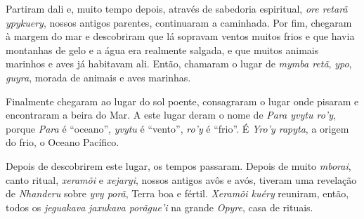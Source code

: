 Partiram dali e, muito tempo depois, através de sabedoria espiritual,
\emph{ore retarã ypykuery}, nossos antigos parentes, continuaram a
caminhada. Por fim, chegaram à margem do mar e descobriram que lá
sopravam ventos muitos frios e que havia montanhas de gelo e a água era
realmente salgada, e que muitos animais marinhos e aves já habitavam
ali. Então, chamaram o lugar de \emph{mymba retã}, \emph{ypo},
\emph{guyra}, morada de animais e aves marinhas.

Finalmente chegaram ao lugar do sol poente, consagraram o lugar onde
pisaram e encontraram a beira do Mar. A este lugar deram o nome de
\emph{Para yvytu ro'y}, porque \emph{Para} é ``oceano'', \emph{yvytu} é
``vento'', \emph{ro'y} é ``frio''. É \emph{Yro'y rapyta}, a origem do
frio, o Oceano Pacífico.


 

Depois de descobrirem este lugar, os tempos passaram. Depois de muito
\emph{mborai}, canto ritual, \emph{xeramõi} e \emph{xejaryi}, nossos
antigos avôs e avós, tiveram uma revelação de \emph{Nhanderu} sobre
\emph{yvy porã}, Terra boa e fértil. \emph{Xeramõi kuéry} reuniram,
então, todos os \emph{jeguakava} \emph{jaxukava porãgue'i} na grande
\emph{Opyre}, casa de rituais.


 

 
